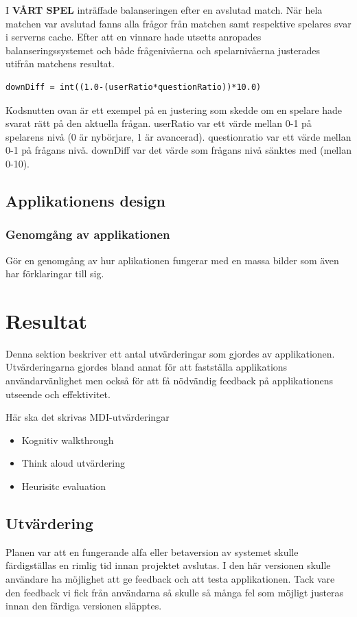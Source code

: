\documentclass[a4paper, 11pt]{article}
\begin{document}
I \textbf{VÅRT SPEL} inträffade balanseringen efter en avslutad match. När hela matchen var avslutad fanns alla frågor från matchen samt respektive spelares svar i serverns cache. Efter att en vinnare hade utsetts anropades balanseringssystemet och både frågenivåerna och spelarnivåerna justerades utifrån matchens resultat.

\begin{verbatim}
downDiff = int((1.0-(userRatio*questionRatio))*10.0)
\end{verbatim}

Kodsnutten ovan är ett exempel på en justering som skedde om en spelare hade svarat rätt på den aktuella frågan. userRatio var ett värde mellan 0-1 på spelarens nivå (0 är nybörjare, 1 är avancerad). questionratio var ett värde mellan 0-1 på frågans nivå. downDiff var det värde som frågans nivå sänktes med (mellan 0-10). 

\subsection{Applikationens design}

\subsubsection{Genomgång av applikationen}
Gör en genomgång av hur aplikationen fungerar med en massa bilder som även har förklaringar till sig.


\section{Resultat}
Denna sektion beskriver ett antal utvärderingar som gjordes av applikationen. Utvärderingarna gjordes bland annat för att fastställa applikations användarvänlighet men också för att få nödvändig feedback på applikationens utseende och effektivitet.  

Här ska det skrivas MDI-utvärderingar
\begin{itemize}
\item Kognitiv walkthrough
\item Think aloud utvärdering
\item Heurisitc evaluation
\end{itemize}

\subsection{Utvärdering}
Planen var att en fungerande alfa eller betaversion av systemet skulle färdigställas en rimlig tid innan projektet avslutas. I den här versionen skulle användare ha möjlighet att ge feedback och att testa applikationen. Tack vare den feedback vi fick från användarna så skulle så många fel som möjligt justeras innan den färdiga versionen släpptes.
\end{document}
